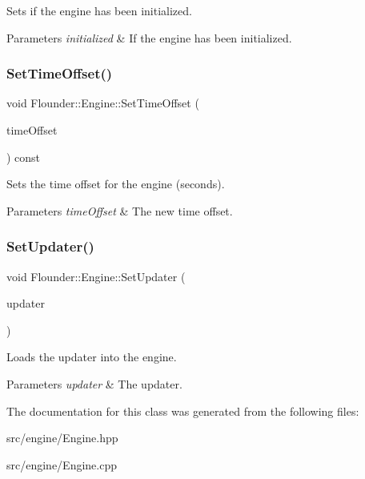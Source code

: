 Sets if the engine has been initialized. 


\begin{DoxyParams}{Parameters}
{\em initialized} & If the engine has been initialized. \\
\hline
\end{DoxyParams}
\mbox{\label{class_flounder_1_1_engine_a96c8cd565b22fb64be503e13a0b12ad8}} 
\subsubsection{\texorpdfstring{Set\+Time\+Offset()}{SetTimeOffset()}}
{\footnotesize\ttfamily void Flounder\+::\+Engine\+::\+Set\+Time\+Offset (\begin{DoxyParamCaption}\item[{const float \&}]{time\+Offset }\end{DoxyParamCaption}) const\hspace{0.3cm}{\ttfamily [inline]}}



Sets the time offset for the engine (seconds). 


\begin{DoxyParams}{Parameters}
{\em time\+Offset} & The new time offset. \\
\hline
\end{DoxyParams}
\mbox{\label{class_flounder_1_1_engine_a6a756a97d38313bb3b8e0ef47a3767f8}} 
\subsubsection{\texorpdfstring{Set\+Updater()}{SetUpdater()}}
{\footnotesize\ttfamily void Flounder\+::\+Engine\+::\+Set\+Updater (\begin{DoxyParamCaption}\item[{\hyperlink{class_flounder_1_1_i_updater}{I\+Updater} $\ast$}]{updater }\end{DoxyParamCaption})}



Loads the updater into the engine. 


\begin{DoxyParams}{Parameters}
{\em updater} & The updater. \\
\hline
\end{DoxyParams}


The documentation for this class was generated from the following files\+:\begin{DoxyCompactItemize}
\item 
src/engine/Engine.\+hpp\item 
src/engine/Engine.\+cpp\end{DoxyCompactItemize}
